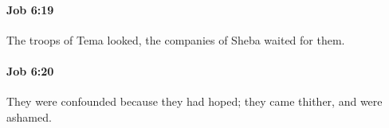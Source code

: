 		\paragraph{Job 6:19} %
			\label{JOB-6-19}

			The troops of Tema looked, the companies of Sheba waited for them.


		\paragraph{Job 6:20} %
			\label{JOB-6-20}

			They were confounded because they had hoped; they came thither, and were ashamed.


